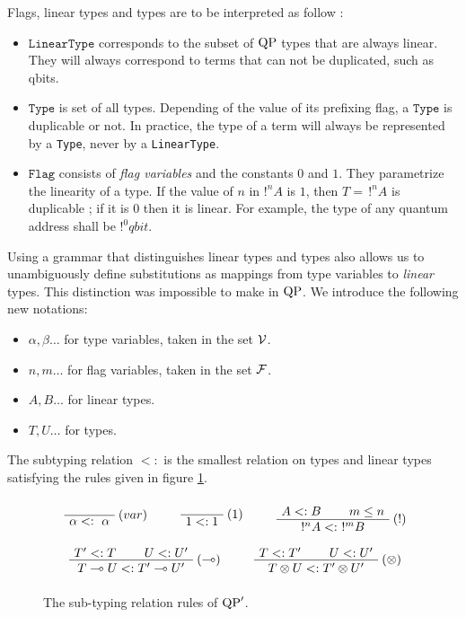 Flags, linear types and types are to be interpreted as follow :
\begin{itemize}
	\item $\texttt{LinearType}$ corresponds to the subset of ${\rm QP}$ types that are always linear. They will always correspond to terms that can not be
		duplicated, such as qbits.
	\item $\texttt{Type}$ is set of all types. Depending of the value of its prefixing flag, a $\texttt{Type}$ is duplicable or not.
		In practice, the type of a term will always be represented by a \texttt{Type}, never by a \texttt{LinearType}.
	\item $\texttt{Flag}$ consists of \textit{flag variables} and the constants $0$ and $1$. They parametrize the linearity of a type.
		If the value of $n$ in $!^n A$ is $1$, then $T = \,!^n A$ is duplicable ; if it is $0$ then it is linear. For example, the type
		of any quantum address shall be $!^0 qbit$.
\end{itemize}
Using a grammar that distinguishes linear types and types also allows us to unambiguously define substitutions as mappings from type variables to \textit{linear} types. This distinction was impossible to make in ${\rm QP}$. We introduce the following new notations:
\begin{itemize}
	\item $\alpha, \beta \dots$ for type variables, taken in the set $\mathcal{V}$.
	\item $n, m \dots$ for flag variables, taken in the set $\mathcal{F}$.
	\item $A, B \dots$ for linear types.
	\item $T, U \dots$ for types.
\end{itemize}

\begin{defn} The subtyping relation $<:$ is the smallest relation on types and linear types satisfying the rules given in figure \ref{subtypingQP'}.
\end{defn}

\begin{figure}[!ht]
\begin{mdframed}
	$$ $$
	$$ \mbox{
  	\AxiomC{}
  	\RightLabel{$(var)$}
	 	\UnaryInfC{$\alpha <: ~ \alpha$}
	 	\DisplayProof
		~~
		~~
		\AxiomC{}
	 	\RightLabel{$(1)$}
	 	\UnaryInfC{$1 <: 1$}
		\DisplayProof
		~~
		~~
	 	\AxiomC{$A <: B$}
	 	\AxiomC{$m \le n$}
	 	\RightLabel{$(!)$}
	 	\BinaryInfC{$!^n A <: ~ !^m B$}
		\DisplayProof
	} $$
	$$ $$
	$$ \mbox{
	 	\AxiomC{$T' <: T$}
	 	\AxiomC{$U <: U'$}
	 	\RightLabel{$(\multimap)$}
	 	\BinaryInfC{$T \multimap U <: T' \multimap U'$}
		\DisplayProof
		~~
		~~
	 	\AxiomC{$T <: T'$}
	 	\AxiomC{$U <: U'$}
	 	\RightLabel{$(\otimes)$}
	 	\BinaryInfC{$T \otimes U <: T' \otimes U'$}
		\DisplayProof
	} $$
	$$ $$
\end{mdframed}
\caption{The sub-typing relation rules of ${\rm QP}'$.}
\label{subtypingQP'}
\end{figure}

